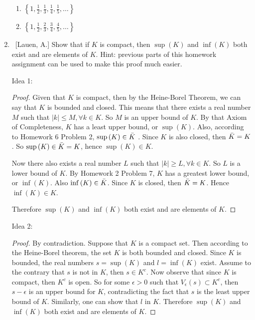 \documentclass[10pt]{article}
\theoremstyle{definition}
\begin{document}
\begin{enumerate}
\begin{enumerate}
	\item  $\left\{1, \frac{1}{2}, \frac{1}{3}, \frac{1}{4}, \frac{1}{5}, \ldots \right\}$
	
	\item  $\left\{1, \frac{1}{2}, \frac{2}{3}, \frac{3}{4}, \frac{4}{5}, \ldots \right\}$
	
	\end{enumerate}
	

\item  ~[Lauen, A.] Show that if $K$ is compact, then $\sup{(K)}$ and $\inf{(K)}$ both exist and are elements of $K$.  Hint: previous parts of this homework assignment can be used to make this proof much easier.

Idea 1:
\begin{proof}	
      Given that $K$ is compact, then by the Heine-Borel Theorem, we can say that $K$ is bounded and closed.  This means that there exists a real number $M$ such that $|k|\leq M, \forall k \in K$.  So $M$ is an upper bound of $K$.  By that Axiom of Completeness, $K$ has a least upper bound, or $\sup{(K)}$.  Also, according to Homework 6 Problem 2, $\sup{(K)} \in \Bar{K}$ .  Since $K$ is also closed, then $\Bar{K}=K$.  So $\sup{(K)} \in \Bar{K}=K$, hence $\sup{(K)} \in K$.  

      Now there also exists a real number $L$ such that $|k|\geq L, \forall k \in K$.  So $L$ is a lower bound of $K$.  By Homework 2 Problem 7, $K$ has a greatest lower bound, or $\inf{(K)}$.  Also $\inf{(K)} \in \Bar{K}$.  Since $K$ is closed, then $\Bar{K}=K$.  Hence $\inf{(K)} \in K$.

      Therefore $\sup{(K)}$ and $\inf{(K)}$ both exist and are elements of $K$.
 \end{proof}

 Idea 2:
 \begin{proof}
 By contradiction.  Suppose that $K$ is a compact set.  Then according to the Heine-Borel theorem, the set $K$ is both bounded and closed.  Since $K$ is bounded, the real numbers $s=\sup{(K)}$ and $l =\inf{(K)}$ exist.  Assume to the contrary that $s$ is not in $K$, then $s \in K^c$.  Now observe that since $K$ is compact, then $K^c$ is open.  So for some $\epsilon > 0$ such that $V_{\epsilon}(s) \subset K^c$, then $s-\epsilon$ is an upper bound for $K$, contradicting the fact that $s$ is the least upper bound of $K$.  Similarly, one can show that $l$ in $K$.  Therefore $\sup{(K)}$ and $\inf{(K)}$ both exist and are elements of $K$.
 \end{proof}
	

\end{enumerate}
\end{document}
